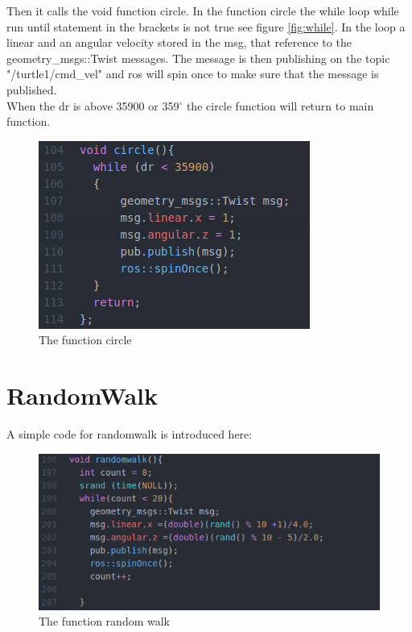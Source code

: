 Then it calls the void function circle. In the function circle the while loop while run until statement in the brackets is not true see figure \ref{fig:while}. In the loop a linear and an angular velocity stored in the msg, that reference to the geometry\_msgs::Twist messages. The message is then publishing on the topic "/turtle1/cmd\_vel" and ros will spin once to make sure that the message is published.\\  When the dr is above 35900 or 359${^\circ}$ the circle function will return to main function.

\begin{figure}[h]
\begin{center}
\includegraphics[width=.5\textwidth]{figures/void-circle.png}
\caption{The function circle}\label{fig:void-circle}
\end{center}
\end{figure}

\section{RandomWalk}

A simple code for randomwalk is introduced here:

\begin{figure}[h]
\begin{center}
\includegraphics[width=.5\textwidth]{figures/randomWalk.png}
\caption{The function random walk}\label{fig:randomWalk}
\end{center}
\end{figure}

